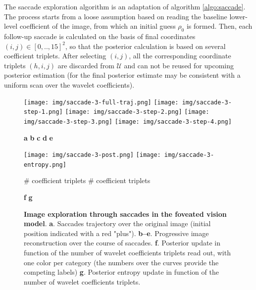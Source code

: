 \documentclass{article} %
\begin{document}
The saccade exploration algorithm is an adaptation of algorithm \ref{algo:saccade}. The process starts from a loose assumption based on reading the baseline lower-level coefficient of the image, from which an initial guess $\rho_0$ is formed. Then, each follow-up saccade is calculated on the basis of final coordinates $(i,j) \in [0,..,15]^2$, so that the posterior calculation is based on several coefficient triplets. After selecting $(i,j)$, all the corresponding coordinate triplets $(h,i,j)$ are discarded from $\mathcal{U}$ and can not be reused for upcoming posterior estimation (for the final posterior estimate may be consistent with a uniform scan over the wavelet coefficients). 

\begin{figure}[b!]
	\centerline{
		\texttt{[image: img/saccade-3-full-traj.png]} 
		\texttt{[image: img/saccade-3-step-1.png]} 
		\texttt{[image: img/saccade-3-step-2.png]} 
		\texttt{[image: img/saccade-3-step-3.png]} 
		\texttt{[image: img/saccade-3-step-4.png]}}
	\centerline{\textbf{a} \hspace{2.6cm} \textbf{b} \hspace{2.4cm} \textbf{c} \hspace{2.4cm} \textbf{d} \hspace{2.6cm} \textbf{e}}
	\centerline{\texttt{[image: img/saccade-3-post.png]} 
	\texttt{[image: img/saccade-3-entropy.png]} }
	\vspace{-.2cm}
	\centerline{\# coefficient triplets \hspace{2.9cm} \# coefficient triplets}
	\centerline{\textbf{f} \hspace{5.5cm} \textbf{g}}
	\caption{\textbf{Image exploration through saccades in the foveated vision model}. \textbf{a}. Saccades trajectory over the original image (initial position indicated with a red "plus"). \textbf{b--e}. Progressive image reconstruction over the course of saccades.  \textbf{f}. Posterior update in function of the number of wavelet coefficients triplets read out, with one color per category (the numbers over the curves provide the competing labels) \textbf{g}. Posterior entropy update in function of the number of wavelet coefficients triplets.}\label{fig:foveated-saccades}
\end{figure}
\end{document}
